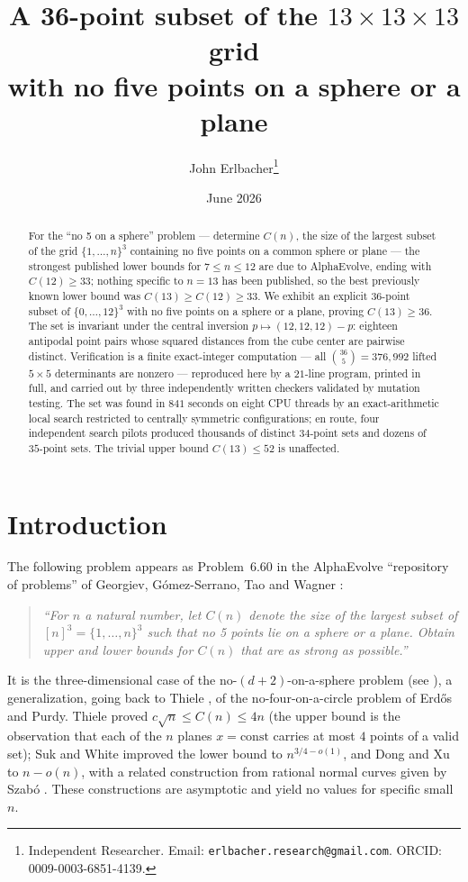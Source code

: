 \documentclass[10pt]{article}
\title{A 36-point subset of the $13\times 13\times 13$ grid\\
with no five points on a sphere or a plane}
\author{John Erlbacher\thanks{Independent Researcher. Email: \texttt{erlbacher.research@gmail.com}. ORCID: 0009-0003-6851-4139.}}
\date{June 2026}
\theoremstyle{remark}
\begin{document}
\maketitle

\begin{abstract}
For the ``no 5 on a sphere'' problem --- determine $C(n)$, the size of the
largest subset of the grid $\{1,\dots,n\}^3$ containing no five points on a
common sphere or plane --- the strongest published lower bounds for
$7 \le n \le 12$ are due to AlphaEvolve, ending with $C(12) \ge 33$; nothing
specific to $n = 13$ has been published, so the best previously known lower
bound was $C(13) \ge C(12) \ge 33$. We exhibit an explicit $36$-point subset of
$\{0,\dots,12\}^3$ with no five points on a sphere or a plane, proving
$C(13) \ge 36$. The set is invariant under the central inversion
$p \mapsto (12,12,12) - p$: eighteen antipodal point pairs whose squared
distances from the cube center are pairwise distinct. Verification is a
finite exact-integer computation --- all $\binom{36}{5} = 376{,}992$ lifted
$5 \times 5$ determinants are nonzero --- reproduced here by a $21$-line
program, printed in full, and carried out by three independently written
checkers validated by mutation testing. The set was found in $841$ seconds
on eight CPU threads by an exact-arithmetic local search restricted to
centrally symmetric configurations; en route, four independent search
pilots produced thousands of distinct $34$-point sets and dozens of
$35$-point sets. The trivial upper bound $C(13) \le 52$ is unaffected.
\end{abstract}

\section{Introduction}\label{sec:intro}

The following problem appears as Problem~6.60 in the AlphaEvolve
``repository of problems'' of Georgiev, G\'omez-Serrano, Tao and Wagner
\cite{AlphaEvolveMath,Repo}:

\begin{quote}
\emph{``For $n$ a natural number, let $C(n)$ denote the size of the largest
subset of $[n]^3 = \{1,\dots,n\}^3$ such that no 5 points lie on a sphere or
a plane. Obtain upper and lower bounds for $C(n)$ that are as strong as
possible.''}
\end{quote}

\noindent
It is the three-dimensional case of the no-$(d{+}2)$-on-a-sphere problem
(see \cite[Problem~4 of Chapter~10.1]{BMP2005}), a generalization, going
back to Thiele \cite{Thiele1995}, of the no-four-on-a-circle problem of
Erd\H{o}s and Purdy. Thiele \cite{Thiele1995} proved
$c\sqrt{n} \le C(n) \le 4n$ (the upper bound is the observation that each of
the $n$ planes $x = \text{const}$ carries at most $4$ points of a valid
set); Suk and White \cite{SukWhite2025} improved the lower bound to
$n^{3/4-o(1)}$, and Dong and Xu \cite{DongXu2025} to $n - o(n)$, with a
related construction from rational normal curves given by Szab\'o
\cite{Szabo2025}. These constructions are asymptotic and yield no values for
specific small $n$.
\end{document}
